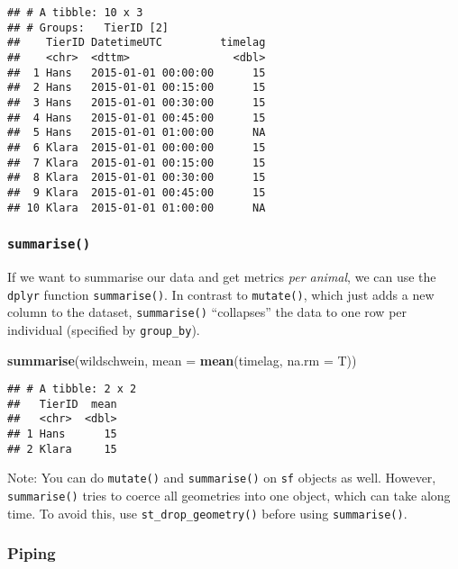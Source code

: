 \documentclass[
]{article}
\newenvironment{Shaded}{\begin{snugshade}}{\end{snugshade}}
\newcommand{\DataTypeTok}[1]{\textcolor[rgb]{0.13,0.29,0.53}{#1}}
\newcommand{\KeywordTok}[1]{\textcolor[rgb]{0.13,0.29,0.53}{\textbf{#1}}}
\newcommand{\NormalTok}[1]{#1}
\begin{document}
\begin{verbatim}
## # A tibble: 10 x 3
## # Groups:   TierID [2]
##    TierID DatetimeUTC         timelag
##    <chr>  <dttm>                <dbl>
##  1 Hans   2015-01-01 00:00:00      15
##  2 Hans   2015-01-01 00:15:00      15
##  3 Hans   2015-01-01 00:30:00      15
##  4 Hans   2015-01-01 00:45:00      15
##  5 Hans   2015-01-01 01:00:00      NA
##  6 Klara  2015-01-01 00:00:00      15
##  7 Klara  2015-01-01 00:15:00      15
##  8 Klara  2015-01-01 00:30:00      15
##  9 Klara  2015-01-01 00:45:00      15
## 10 Klara  2015-01-01 01:00:00      NA
\end{verbatim}

\hypertarget{summarise}{%
\subsubsection{\texorpdfstring{\texttt{summarise()}}{summarise()}}\label{summarise}}

If we want to summarise our data and get metrics \emph{per animal}, we
can use the \texttt{dplyr} function \texttt{summarise()}. In contrast to
\texttt{mutate()}, which just adds a new column to the dataset,
\texttt{summarise()} ``collapses'' the data to one row per individual
(specified by \texttt{group\_by}).

\begin{Shaded}
\begin{Highlighting}[]
\KeywordTok{summarise}\NormalTok{(wildschwein, }\DataTypeTok{mean =} \KeywordTok{mean}\NormalTok{(timelag, }\DataTypeTok{na.rm =}\NormalTok{ T))}
\end{Highlighting}
\end{Shaded}

\begin{verbatim}
## # A tibble: 2 x 2
##   TierID  mean
##   <chr>  <dbl>
## 1 Hans      15
## 2 Klara     15
\end{verbatim}

Note: You can do \texttt{mutate()} and \texttt{summarise()} on
\texttt{sf} objects as well. However, \texttt{summarise()} tries to
coerce all geometries into one object, which can take along time. To
avoid this, use \texttt{st\_drop\_geometry()} before using
\texttt{summarise()}.

\hypertarget{piping}{%
\subsubsection{Piping}\label{piping}}
\end{document}
